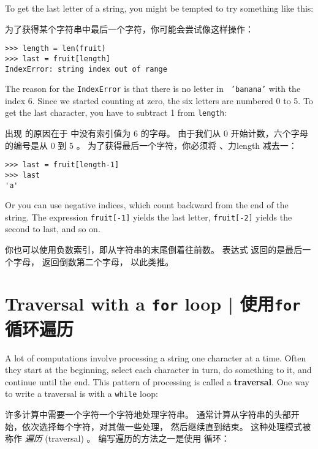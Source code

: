 %
To get the last letter of a string, you might be tempted to try something
like this:
  

为了获得某个字符串中最后一个字符，你可能会尝试像这样操作：

\begin{lstlisting}
>>> length = len(fruit)
>>> last = fruit[length]
IndexError: string index out of range
\end{lstlisting}

%
The reason for the {\tt IndexError} is that there is no letter in {\tt
'banana'} with the index 6.  Since we started counting at zero, the
six letters are numbered 0 to 5.  To get the last character, you have
to subtract 1 from {\tt length}:

出现  的原因在于  中没有索引值为 6 的字母。 由于我们从 0 开始计数，六个字母的编号是从 0 到 5 。 为了获得最后一个字符，你必须将 、力{length} 减去一：

\begin{lstlisting}
>>> last = fruit[length-1]
>>> last
'a'
\end{lstlisting}

%
Or you can use negative indices, which count backward from
the end of the string.  The expression {\tt fruit[-1]} yields the last
letter, {\tt fruit[-2]} yields the second to last, and so on.
  

你也可以使用负数索引，即从字符串的末尾倒着往前数。 表达式  返回的是最后一个字母，  返回倒数第二个字母， 以此类推。
  
  


\section{Traversal with a {\tt for} loop  |  使用{\tt for}循环遍历}
\label{for}
  
  
  

A lot of computations involve processing a string one character at a
time.  Often they start at the beginning, select each character in
turn, do something to it, and continue until the end.  This pattern of
processing is called a {\bf traversal}.  One way to write a traversal
is with a {\tt while} loop:

许多计算中需要一个字符一个字符地处理字符串。 通常计算从字符串的头部开始，依次选择每个字符，对其做一些处理，
然后继续直到结束。 这种处理模式被称作 {\em 遍历} (traversal) 。 编写遍历的方法之一是使用  循环：


